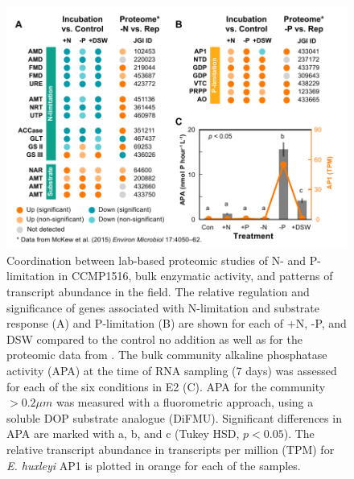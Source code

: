 \begin{figure}[h!]
  \centering
    \includegraphics[width=1\textwidth]{Images/C5_Figure5_McKewComparison_v2.pdf}
    \caption[Coordination between lab-based proteomic studies of N- and P-limitation in CCMP1516, bulk enzymatic activity, and patterns of transcript abundance in the field]{Coordination between lab-based proteomic studies of N- and P-limitation in CCMP1516, bulk enzymatic activity, and patterns of transcript abundance in the field. The relative regulation and significance of genes associated with N-limitation and substrate response (A) and P-limitation (B) are shown for each of +N, -P, and DSW compared to the control no addition as well as for the proteomic data from \citet{McKew2015}.  The bulk community alkaline phosphatase activity (APA) at the time of RNA sampling (7 days) was assessed for each of the six conditions in E2 (C). APA for the community $> 0.2 \mu m$ was measured with a fluorometric approach, using a soluble DOP substrate analogue (DiFMU). Significant differences in APA are marked with a, b, and c (Tukey HSD, $p < 0.05$). The relative transcript abundance in transcripts per million (TPM) for \textit{E. huxleyi} AP1 is plotted in orange for each of the samples. }
  \label{fig:c5f5}
\end{figure}



